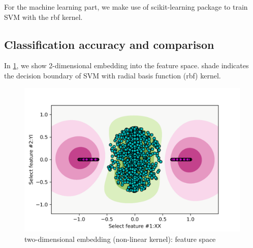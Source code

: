 \documentclass[
reprint,
aps,
pra,
floatfix,
]{revtex4-2}
\theoremstyle{plain}
\theoremstyle{definition}
\begin{document}
For the machine learning part, we make use of scikit-learning package \cite{pedregosaScikitlearnMachineLearning2011} to train SVM with the rbf kernel.


\subsection{Classification accuracy and comparison}


In \cref{fig:feature_space}, we show 2-dimensional embedding into the feature space.
shade indicates the decision boundary of SVM with radial basis function (rbf) kernel.
\begin{figure}[!ht]
	\centering
	\includegraphics[width=.9\linewidth]{./Code/feature_space_2d.png}
	\caption{two-dimensional embedding (non-linear kernel): feature space}
	\label{fig:feature_space}
\end{figure}
\end{document}
